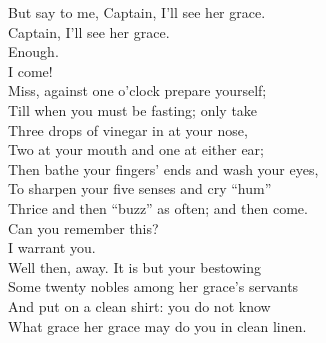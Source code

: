 \documentclass[a4paper,oneside,12pt]{memoir}
\begin{document}
\begin{drama*}
But say to me, Captain, I'll see her grace.\\
\dapperspeaks Captain, I'll see her grace.\\
\facespeaks {} Enough.\\
\subtlespeaks {} I come!\\
Miss, against one o'clock prepare yourself;\\
Till when you must be fasting; only take\\
Three drops of vinegar in at your nose,\\
Two at your mouth and one at either ear;\\
Then bathe your fingers' ends and wash your eyes,\\
To sharpen your five senses and cry ``hum''\\
Thrice and then ``buzz'' as often; and then come.\\
\facespeaks Can you remember this?\\
\dapperspeaks {} I warrant you.\\
\facespeaks Well then, away. It is but your bestowing\\
Some twenty nobles among her grace's servants\\
And put on a clean shirt: you do not know\\
What grace her grace may do you in clean linen.\\

\scene


\end{drama*}
\end{document}
